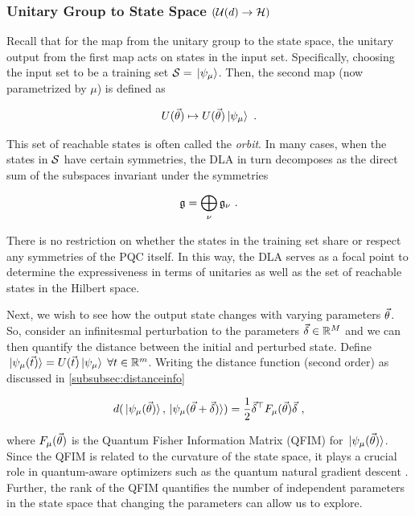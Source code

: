 \subsubsection{Unitary Group to State Space \((\mathcal{U}(d) \to
\mathcal{H})\)} 

Recall that for the map from the unitary group to the state space, the unitary
output from the first map acts on states in the input set. Specifically,
choosing the input set to be a training set \(\mathcal{S} = \ket*{\psi_\mu}\).
Then, the second map (now parametrized by \(\mu\)) is defined as

\begin{equation}
    U(\vec{\theta}) \mapsto U(\vec{\theta})\ket*{\psi_\mu}~.
\end{equation}

This set of reachable states is often called the \emph{orbit}. In many cases,
when the states in \(\mathcal{S}\) have certain symmetries, the DLA in turn
decomposes as the direct sum of the subspaces invariant under the symmetries

\begin{equation}
    \mathfrak{g} = \bigoplus_\nu \mathfrak{g}_\nu~.
\end{equation}

There is no restriction on whether the states in the training set share or
respect any symmetries of the PQC itself. In this way, the DLA serves as a focal
point to determine the expressiveness in terms of unitaries as well as the set
of reachable states in the Hilbert space.

Next, we wish to see how the output state changes with varying parameters
\(\vec{\theta}\). So, consider an infinitesmal perturbation to the parameters
\(\vec{\delta} \in \mathbb{R}^M\) and we can then quantify the distance between the
initial and perturbed state. Define \(\ket*{\psi_\mu(\vec{t})} =
U(\vec{t})\ket*{\psi_\mu}\;\forall t \in \mathbb{R}^m\). Writing the distance
function (second order) as discussed in \autoref{subsubsec:distanceinfo}

\begin{equation}
    d(\ket*{\psi_\mu (\vec{\theta})}, \ket*{\psi_\mu(\vec{\theta} + \vec{\delta})}) = \frac{1}{2} \vec{\delta}^\top F_\mu(\vec{\theta}) \vec{\delta}~,
\end{equation}

where \(F_\mu(\vec{\theta})\) is the Quantum Fisher Information Matrix (QFIM) for
\(\ket*{\psi_\mu(\vec{\theta})}\). Since the QFIM is related to the curvature of
the state space, it plays a crucial role in quantum-aware optimizers such as the
quantum natural gradient descent
\cite{stokes2020quantum,koczor2019quantum,gacon2021simultaneous,haug2021natural}.
Further, the rank of the QFIM quantifies the number of independent parameters in
the state space that changing the parameters can allow us to explore.

